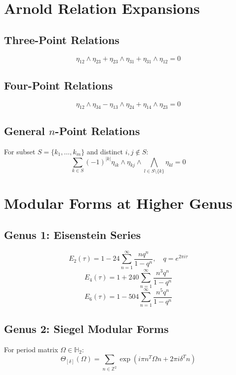 \section{Arnold Relation Expansions}

\subsection{Three-Point Relations}

$$\eta_{12} \wedge \eta_{23} + \eta_{23} \wedge \eta_{31} + \eta_{31} \wedge \eta_{12} = 0$$

\subsection{Four-Point Relations}

$$\eta_{12} \wedge \eta_{34} - \eta_{13} \wedge \eta_{24} + \eta_{14} \wedge \eta_{23} = 0$$

\subsection{General $n$-Point Relations}

For subset $S = \{k_1, \ldots, k_m\}$ and distinct $i, j \notin S$:
$$\sum_{k \in S} (-1)^{|k|} \eta_{ik} \wedge \eta_{kj} \wedge \bigwedge_{l \in S \setminus \{k\}} \eta_{kl} = 0$$

\section{Modular Forms at Higher Genus}

\subsection{Genus 1: Eisenstein Series}

$$E_2(\tau) = 1 - 24\sum_{n=1}^\infty \frac{nq^n}{1-q^n}, \quad q = e^{2\pi i \tau}$$
$$E_4(\tau) = 1 + 240\sum_{n=1}^\infty \frac{n^3q^n}{1-q^n}$$
$$E_6(\tau) = 1 - 504\sum_{n=1}^\infty \frac{n^5q^n}{1-q^n}$$

\subsection{Genus 2: Siegel Modular Forms}

For period matrix $\Omega \in \mathbb{H}_2$:
$$\Theta_{[\delta]}(\Omega) = \sum_{n \in \mathbb{Z}^2} \exp(i\pi n^T \Omega n + 2\pi i \delta^T n)$$

